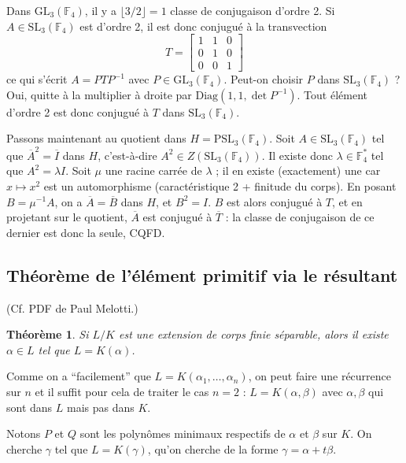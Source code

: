 \documentclass[a4paper, 11pt]{article}
\def\F{\mathbb{F}}
\def\GL{\mathrm{GL}}
\def\SL{\mathrm{SL}}
\def\PSL{\mathrm{PSL}}
\newtheorem*{theorem}{Théorème}
\begin{document}
Dans $\GL_3(\F_4)$, il y a $\lfloor 3/2 \rfloor = 1$ classe de conjugaison
d'ordre 2. Si $A \in \SL_3(\F_4)$ est d'ordre 2, il est donc conjugué à la
transvection
\[ T = \left[\begin{matrix}
      1 & 1 & 0 \\
      0 & 1 & 0 \\
      0 & 0 & 1
    \end{matrix}\right] \]
ce qui s'écrit $A = PTP^{-1}$ avec $P \in \GL_3(\F_4)$. Peut-on choisir $P$ dans
$\SL_3(\F_4)$ ? Oui, quitte à la multiplier à droite par $\mathrm{Diag}(1,1,\det
P^{-1})$. Tout élément d'ordre 2 est donc conjugué à $T$ dans $\SL_3(\F_4)$.

Passons maintenant au quotient dans $H = \PSL_3(\F_4)$. Soit $A \in \SL_3(\F_4)$
tel que $\overline{A}^2 = \overline{I}$ dans $H$, c'est-à-dire $A^2 \in
Z(\SL_3(\F_4))$. Il existe donc $\lambda \in \F_4^*$ tel que $A^2 = \lambda I$.
Soit $\mu$ une racine carrée de $\lambda$ ; il en existe (exactement) une car $x
\mapsto x^2$ est un automorphisme (caractéristique 2 + finitude du corps). En
posant $B = \mu^{-1}A$, on a $\overline{A} = \overline{B}$ dans $H$, et $B^2 =
I$. $B$ est alors conjugué à $T$, et en projetant sur le quotient,
$\overline{A}$ est conjugué à $\overline{T}$ : la classe de conjugaison de ce
dernier est donc la seule, CQFD.

\newpage

\subsection{Théorème de l'élément primitif via le résultant}

(Cf. PDF de Paul Melotti.)

\begin{theorem}
  Si $L/K$ est une extension de corps finie séparable, alors il existe $\alpha
  \in L$ tel que $L = K(\alpha)$.
\end{theorem}

Comme on a \enquote{facilement} que $L = K(\alpha_1, \ldots, \alpha_n)$, on peut
faire une récurrence sur $n$ et il suffit pour cela de traiter le cas $n = 2$ :
$L = K(\alpha,\beta)$ avec $\alpha, \beta$ qui sont dans $L$ mais pas dans $K$.

Notons $P$ et $Q$ sont les polynômes minimaux respectifs de $\alpha$ et $\beta$
sur $K$. On cherche $\gamma$ tel que $L = K(\gamma)$, qu'on cherche de la forme
$\gamma = \alpha + t\beta$.

\newpage
\end{document}
